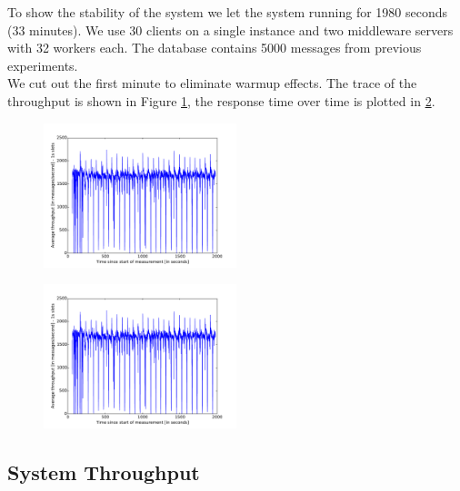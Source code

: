 \documentclass[11pt]{article}
\begin{document}
To show the stability of the system we let the system running for 1980 seconds (33 minutes). We use 30 clients on a single instance and two middleware servers with 32 workers each. The database contains 5000 messages from previous experiments.\\
We cut out the first minute to eliminate warmup effects.
The trace of the throughput is shown in Figure \ref{fig:throughput30min}, the response time over time is plotted in \ref{fig:response30min}.
\begin{figure}
  \begin{center}
    \includegraphics[width=0.5\textwidth]{../results/30min_small_throughput.pdf}
    \caption{}
    \label{fig:throughput30min}
  \end{center}
\end{figure}
\begin{figure}
  \begin{center}
    \includegraphics[width=0.5\textwidth]{../results/30min_small_throughput.pdf}
    \caption{}
    \label{fig:response30min}
  \end{center}
\end{figure}

\subsection{System Throughput}\label{sec:system-throughput}
\end{document}
